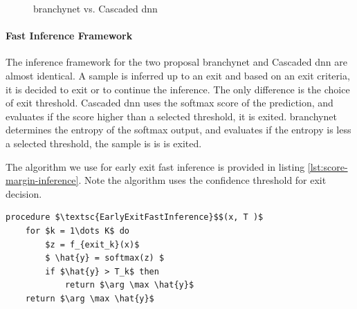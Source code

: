 \begin{figure}
	\caption[\gls{branchynet} vs. Cascaded \gls{dnn}]{\gls{branchynet} vs. Cascaded \gls{dnn}}
	\label{fig:cascaded-vs-branchy}
\end{figure}

\paragraph{Fast Inference Framework} The inference framework for the two proposal \gls{branchynet} and Cascaded \gls{dnn} are almost identical. A sample is inferred up to an exit and based on an exit criteria, it is decided to exit or to continue the inference. The only difference is the choice of exit threshold. Cascaded \gls{dnn} uses the softmax score of the prediction, and evaluates if the score higher than a selected threshold, it is exited. \gls{branchynet} determines the entropy of the softmax output, and evaluates if the entropy is less a selected threshold, the sample is is is exited.

The algorithm we use for early exit fast inference is provided in listing \ref{lst:score-margin-inference}. Note the algorithm uses the confidence threshold for exit decision.

\begin{minipage}{\linewidth}
	\begin{lstlisting}[language = {}, mathescape=true, caption={Early Exit using Score-margin }, label={lst:score-margin-inference}]
procedure $\textsc{EarlyExitFastInference}$$(x, T )$
	for $k = 1\dots K$ do
		$z = f_{exit_k}(x)$
		$ \hat{y} = softmax(z) $
		if $\hat{y} > T_k$ then
			return $\arg \max \hat{y}$
	return $\arg \max \hat{y}$ 
	\end{lstlisting}
\end{minipage}

